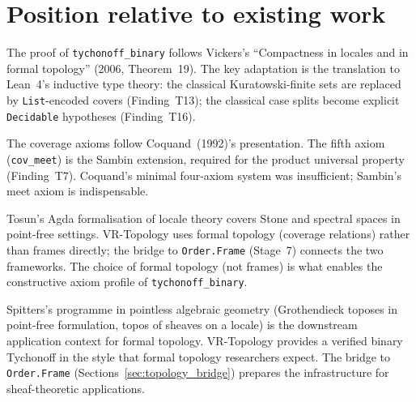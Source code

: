 \section{Position relative to existing work}
\label{sec:topology_comparison}

\begin{remark}[Vickers (2006)]
\label{rem:compare_vickers}
The proof of \texttt{tychonoff\_binary} follows Vickers's
``Compactness in locales and in formal topology'' (2006, Theorem~19).
The key adaptation is the translation to Lean~4's inductive type theory:
the classical Kuratowski-finite sets are replaced by
\texttt{List}-encoded covers (Finding~T13); the classical case splits
become explicit \texttt{Decidable} hypotheses (Finding~T16).
\end{remark}

\begin{remark}
\label{rem:compare_coquand}
The coverage axioms follow Coquand~(1992)'s presentation.  The fifth
axiom (\texttt{cov\_meet}) is the Sambin extension, required for the
product universal property (Finding~T7).  Coquand's minimal four-axiom
system was insufficient; Sambin's meet axiom is indispensable.
\end{remark}

\begin{remark}
\label{rem:compare_tosun}
Tosun's Agda formalisation of locale theory covers Stone and spectral
spaces in point-free settings.  VR-Topology uses formal topology
(coverage relations) rather than frames directly; the bridge to
\texttt{Order.Frame} (Stage~7) connects the two frameworks.
The choice of formal topology (not frames) is what enables the
constructive axiom profile of \texttt{tychonoff\_binary}.
\end{remark}

\begin{remark}
\label{rem:compare_spitters}
Spitters's programme in pointless algebraic geometry (Grothendieck
toposes in point-free formulation, topos of sheaves on a locale) is
the downstream application context for formal topology.  VR-Topology
provides a verified binary Tychonoff in the style that formal topology
researchers expect.  The bridge to \texttt{Order.Frame} (Sections~\ref{sec:topology_bridge})
prepares the infrastructure for sheaf-theoretic applications.
\end{remark}

